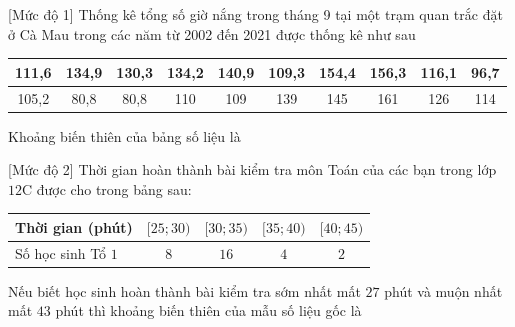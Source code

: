 \begin{bt}%
[Mức độ 1]
	Thống kê tổng số giờ nắng trong tháng 9 tại một trạm quan trắc đặt ở Cà Mau trong các năm từ 2002 đến 2021 được thống kê như sau
	\begin{center}
		\begin{tabular}{|c|c|c|c|c|c|c|c|c|c|}
			\hline 111,6 & 134,9 & 130,3 & 134,2 & 140,9 & 109,3 & 154,4 & 156,3 & 116,1 & 96,7 \\
			\hline 105,2 & 80,8 & 80,8 & 110 & 109 & 139 & 145 & 161 & 126 & 114 \\
			\hline
		\end{tabular}
	\end{center}
	Khoảng biến thiên của bảng số liệu là
\end{bt}

\begin{bt}%
[Mức độ 2]
	Thời gian hoàn thành bài kiểm tra môn Toán của các bạn trong lớp $12$C được cho trong bảng sau:
	\begin{center}
		\begin{tabular}{|l|c|c|c|c|}
			\hline
			Thời gian (phút) & $[25;30 )$ & $[30;35)$ &$[35;40 )$ & $[40;45)$ \\
			\hline
			Số học sinh Tổ $1$ & $8$ & $16$ & $4$ & $2$ \\
			\hline
		\end{tabular}
	\end{center}
	Nếu biết học sinh hoàn thành bài kiểm tra sớm nhất mất $27$ phút và muộn nhất mất $43$ phút thì khoảng biến thiên của mẫu số liệu gốc là
\end{bt}

